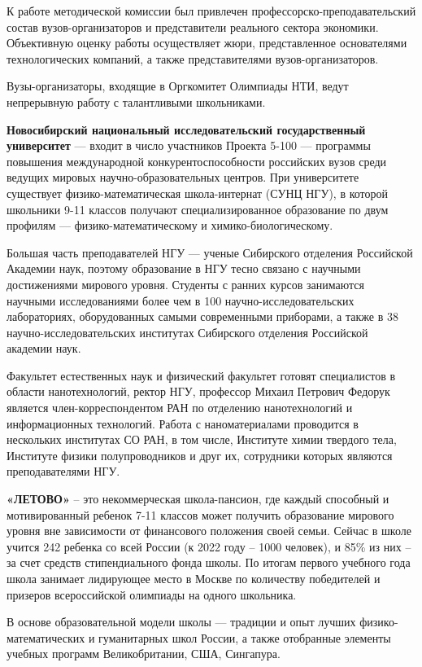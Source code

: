 К работе методической комиссии был привлечен профессорско-преподавательский состав вузов-организаторов и представители реального сектора экономики. Объективную оценку работы осуществляет жюри, представленное основателями технологических компаний, а также представителями вузов-организаторов.  

Вузы-организаторы, входящие в Оргкомитет Олимпиады НТИ, ведут непрерывную работу с талантливыми школьниками.

\textbf{Новосибирский национальный исследовательский государственный университет} — входит в число участников Проекта 5-100 — программы повышения международной конкурентоспособности российских вузов среди ведущих мировых научно-образовательных центров. При университете существует физико-\linebreak математическая школа-интернат (СУНЦ НГУ), в которой школьники 9-11 классов получают специализированное образование по двум профилям — физико-\linebreak математическому и химико-биологическому. 

Большая часть преподавателей НГУ — ученые Сибирского отделения Российской Академии наук, поэтому образование в НГУ тесно связано с научными достижениями мирового уровня. Студенты с ранних курсов занимаются научными исследованиями более чем в 100 научно-исследовательских лабораториях, оборудованных самыми современными приборами, а также в 38 научно-исследовательских институтах Сибирского отделения Российской академии наук.

Факультет естественных наук и физический факультет готовят специалистов в области нанотехнологий, ректор НГУ, профессор Михаил Петрович Федорук является член-корреспондентом РАН по отделению нанотехнологий и информационных технологий. Работа с наноматериалами проводится в нескольких институтах СО РАН, в том числе, Институте химии твердого тела, Институте физики полупроводников и друг их, сотрудники которых являются преподавателями НГУ.

\textbf{«ЛЕТОВО»} – это некоммерческая школа-пансион, где каждый способный и мотивированный ребенок 7-11 классов может получить образование мирового уровня вне зависимости от финансового положения своей семьи. Сейчас в школе учится 242 ребенка со всей России (к 2022 году – 1000 человек), и 85\% из них – за счет средств стипендиального фонда школы. По итогам первого учебного года школа занимает лидирующее место в Москве по количеству победителей и призеров всероссийской олимпиады на одного школьника. 

В основе образовательной модели школы — традиции и опыт лучших физико-математических и гуманитарных школ России, а также отобранные элементы учебных программ Великобритании, США, Сингапура. 

